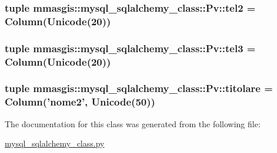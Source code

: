 \label{classmmasgis_1_1mysql__sqlalchemy__class_1_1Pv_ad9a9351c352abf2b8a07dcde54f37408}
\hypertarget{classmmasgis_1_1mysql__sqlalchemy__class_1_1Pv_a2a35d685cb25847cad8db9eb6f44b7ca}{
\subsubsection[{tel2}]{\setlength{\rightskip}{0pt plus 5cm}tuple {\bf mmasgis::mysql\_\-sqlalchemy\_\-class::Pv::tel2} = Column(Unicode(20))}}
\label{classmmasgis_1_1mysql__sqlalchemy__class_1_1Pv_a2a35d685cb25847cad8db9eb6f44b7ca}
\hypertarget{classmmasgis_1_1mysql__sqlalchemy__class_1_1Pv_a5ae160c55afaa0fd0370deb7aabeb332}{
\subsubsection[{tel3}]{\setlength{\rightskip}{0pt plus 5cm}tuple {\bf mmasgis::mysql\_\-sqlalchemy\_\-class::Pv::tel3} = Column(Unicode(20))}}
\label{classmmasgis_1_1mysql__sqlalchemy__class_1_1Pv_a5ae160c55afaa0fd0370deb7aabeb332}
\hypertarget{classmmasgis_1_1mysql__sqlalchemy__class_1_1Pv_a5d322b95112b730932468f017950a09b}{
\subsubsection[{titolare}]{\setlength{\rightskip}{0pt plus 5cm}tuple {\bf mmasgis::mysql\_\-sqlalchemy\_\-class::Pv::titolare} = Column('nome2', Unicode(50))}}
\label{classmmasgis_1_1mysql__sqlalchemy__class_1_1Pv_a5d322b95112b730932468f017950a09b}


The documentation for this class was generated from the following file:\begin{DoxyCompactItemize}
\item 
\hyperlink{mysql__sqlalchemy__class_8py}{mysql\_\-sqlalchemy\_\-class.py}\end{DoxyCompactItemize}

